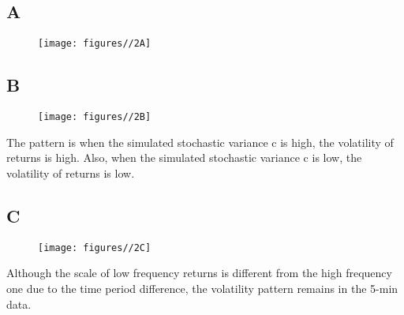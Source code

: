 \documentclass{report}
\begin{document}
\subsection{A}
\begin{figure}[H]
        \centering 
         \texttt{[image: figures//2A]}
\end{figure}

\subsection{B}
\begin{figure}[H]
        \centering 
         \texttt{[image: figures//2B]}
\end{figure}
The pattern is when the simulated stochastic variance c is high, the volatility of returns is high. Also,  when the simulated stochastic variance c is low, the volatility of returns is low.
\subsection{C}
\begin{figure}[H]
        \centering 
         \texttt{[image: figures//2C]}
\end{figure}
Although the scale of low frequency returns is different from the high frequency one due to the time period difference, the volatility pattern remains in the 5-min data.
\end{document}
